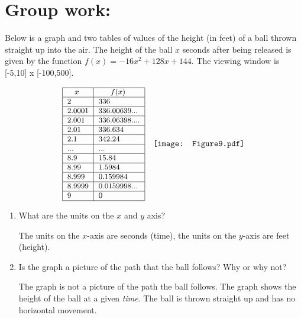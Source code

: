 \documentclass[handout,nooutcomes]{ximera}
\begin{document}
\section*{Group work:}
\begin{problem}
Below is a graph and two tables of values of the height (in feet) of a ball thrown straight up into the air.   The height of the ball $x$ seconds after being released is given by the function $f(x)=-16x^2+128x+144$.  The viewing window is [-5,10] x [-100,500].
	
	
	
	
\[ \begin{array}{lr}

\small{	
\begin{tabular}{|l|l|}
\hline
\hspace{2mm} $x$ & \hspace{4mm} $f(x)$  \\
\hline
2 & 336  \\
\hline
2.0001 & 336.00639...  \\
\hline
2.001 & 336.06398....  \\
\hline
2.01 & 336.634  \\
\hline
2.1 & 342.24  \\
\hline
... & ...  \\
\hline
8.9 & 15.84  \\
\hline
8.99 & 1.5984  \\
\hline
8.999 & 0.159984  \\
\hline
8.9999 & 0.0159998...  \\
\hline
9 & 0 \\
\hline
\end{tabular}
}

&  

\texttt{[image: Figure9.pdf]}


\end{array} \]



	
		\begin{enumerate}
			
		 \item  What are the units on the $x$ and $y$ axis?
		 \begin{freeResponse}		 
		The units on the $x$-axis are seconds (time), the units on the $y$-axis are feet (height).
		\end{freeResponse}
			
		\item  Is the graph a picture of the path that the ball follows?  Why or why not?
		\begin{freeResponse}		 
		 The graph is not a picture of the path the ball follows.  The graph shows the height of the ball at a given \emph{time}.  The ball is thrown straight up and has no horizontal movement.
		\end{freeResponse}
	

\end{enumerate}
\end{problem}
\end{document}
